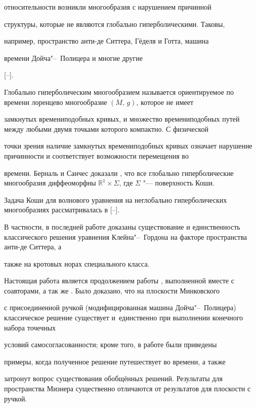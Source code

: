 относительности возникли многообразия с нарушением причинной

структуры, которые не являются глобально гиперболическими. Таковы,

например, пространство анти-де Ситтера, Гёделя и Готта, машина

времени Дойча"--~Полицера и многие другие

[--].



Глобально гиперболическим многообразием называется ориентируемое по времени лоренцево многообразие $(M,\,g)$, которое не имеет

замкнутых времениподобных кривых, и множество времениподобных путей между любыми двумя точками которого компактно. С физической

точки зрения наличие замкнутых времениподобных кривых означает нарушение причинности и соответствует возможности перемещения во

времени. Берналь и Санчес доказали \cite{gro:BernSan}, что все глобально гиперболические многообразия диффеоморфны $\mathbb

R^1 \times \Sigma$, где $\Sigma$ "--- поверхность Коши.



Задача Коши для волнового уравнения на неглобально гиперболических многообразиях рассматривалась в [--].

В частности, в последней работе доказаны существование и единственность классического решения уравнения Клейна"--~Гордона на факторе пространства анти-де Ситтера, а

также на кротовых норах специального класса.



Настоящая работа является продолжением работы \cite{gro:VGGK}, выполненной вместе с соавторами, а так же \cite{gro:Gr}. Было доказано, что на плоскости Минковского

с присоединенной ручкой (модифицированная машина Дойча"--~Полицера)  классическое решение существует и~единственно при выполнении конечного набора точечных

условий самосогласованности; кроме того, в работе \cite{gro:VGGK} были приведены

примеры, когда полученное решение путешествует во времени, а также

затронут вопрос существования обобщённых решений. Результаты для пространства Мизнера существенно отличаются от результатов для плоскости с ручкой.


